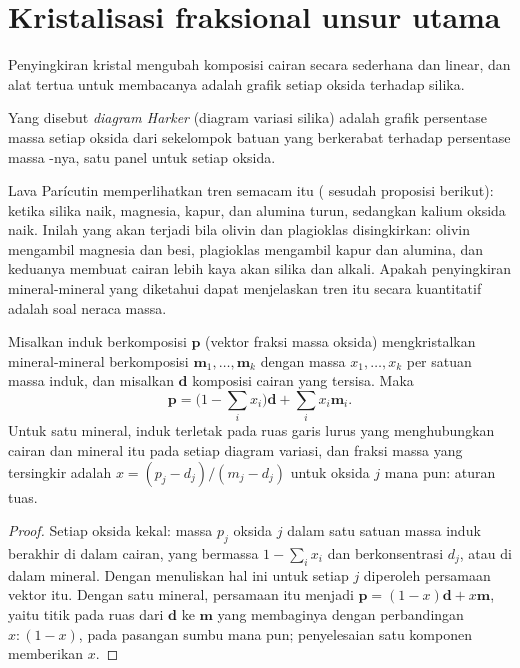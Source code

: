 \section{Kristalisasi fraksional unsur utama}\label{sec:b2:magmatic-differentiation:majors}

Penyingkiran kristal mengubah komposisi cairan secara sederhana dan linear,
dan alat tertua untuk membacanya adalah grafik setiap oksida terhadap silika.

\begin{definition}\label{def:b2:magmatic-differentiation:harker}
Yang disebut \emph{diagram Harker} (diagram variasi silika) adalah grafik
persentase massa setiap oksida dari sekelompok batuan yang berkerabat terhadap persentase massa
-nya, satu panel untuk setiap oksida.
\end{definition}


Lava Parícutin memperlihatkan tren semacam itu ( sesudah proposisi
berikut): ketika silika naik, magnesia, kapur, dan alumina turun, sedangkan kalium oksida naik. Inilah
yang akan terjadi bila olivin dan plagioklas disingkirkan:
olivin mengambil magnesia dan besi, plagioklas mengambil kapur dan alumina, dan keduanya membuat
cairan lebih kaya akan silika dan alkali. Apakah penyingkiran mineral-mineral yang diketahui dapat
menjelaskan tren itu secara kuantitatif adalah soal neraca massa.

\begin{proposition}\label{prop:b2:magmatic-differentiation:lever}
Misalkan  induk berkomposisi $\mathbf p$ (vektor fraksi massa oksida)
mengkristalkan mineral-mineral berkomposisi $\mathbf m_1, \dots, \mathbf m_k$ dengan massa
$x_1, \dots, x_k$ per satuan massa induk, dan misalkan $\mathbf d$ komposisi
cairan yang tersisa. Maka
\[
\mathbf p = \Big(1 - \sum_i x_i\Big)\mathbf d + \sum_i x_i \mathbf m_i .
\]
Untuk satu mineral,  induk terletak pada ruas garis lurus yang menghubungkan cairan dan
mineral itu pada setiap diagram variasi, dan fraksi massa yang tersingkir adalah
$x = (p_j - d_j)/(m_j - d_j)$ untuk oksida $j$ mana pun: aturan tuas.
\end{proposition}

\begin{proof}
Setiap oksida kekal: massa $p_j$ oksida $j$ dalam satu satuan massa induk berakhir
di dalam cairan, yang bermassa $1 - \sum_i x_i$ dan berkonsentrasi $d_j$, atau di dalam
mineral. Dengan menuliskan hal ini untuk setiap $j$ diperoleh persamaan vektor itu. Dengan satu mineral, persamaan itu
menjadi $\mathbf p = (1-x)\mathbf d + x\mathbf m$, yaitu titik pada ruas dari
$\mathbf d$ ke $\mathbf m$ yang membaginya dengan perbandingan $x : (1-x)$, pada pasangan
sumbu mana pun; penyelesaian satu komponen memberikan $x$.
\end{proof}

